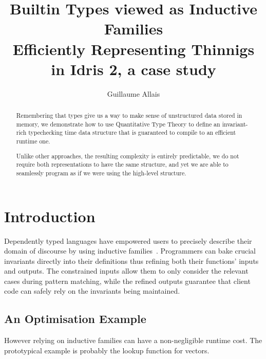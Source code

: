 \documentclass{article}
\newcommand{\idris}{Idris 2}
\begin{document}
\title{Builtin Types viewed as Inductive Families \\
{\large Efficiently Representing Thinnigs in \idris, a case study}}
\author{Guillaume Allais}

\maketitle

\begin{abstract}
  Remembering that types give us a way to make sense of unstructured data stored
  in memory, we demonstrate how to use Quantitative Type Theory to define an
  invariant-rich typechecking time data structure that is guaranteed to compile
  to an efficient runtime one.

  Unlike other approaches, the resulting complexity is entirely predictable, we do
  not require both representations to have the same structure, and yet we are able
  to seamlessly program as if we were using the high-level structure.
\end{abstract}

\section{Introduction}

Dependently typed languages have empowered users to precisely describe their domain
of discourse by using inductive families~\cite{DBLP:journals/fac/Dybjer94}.
%
Programmers can bake crucial invariants directly into their definitions thus refining
both their functions' inputs and outputs.
%
The constrained inputs allow them to only consider the relevant cases during pattern
matching, while the refined outputs guarantee that client code can safely rely on the
invariants being maintained.

\subsection{An Optimisation Example}

However relying on inductive families can have a non-negligible runtime cost.
The prototypical example is probably the lookup function for vectors.



\end{document}
